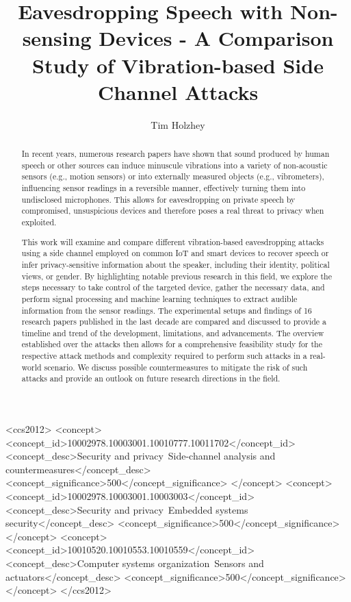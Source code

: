 \documentclass[sigconf, nonacm]{acmart}
\begin{document}
\title{Eavesdropping Speech with Non-sensing Devices - A Comparison Study of Vibration-based Side Channel Attacks}

\author{Tim Holzhey}

\begin{abstract}
  In recent years, numerous research papers have shown that sound produced by human speech or other sources can induce minuscule vibrations into a variety of non-acoustic sensors (e.g., motion sensors) or into externally measured objects (e.g., vibrometers), influencing sensor readings in a reversible manner, effectively turning them into undisclosed microphones.
  This allows for eavesdropping on private speech by compromised, unsuspicious devices and therefore poses a real threat to privacy when exploited.

  This work will examine and compare different vibration-based eavesdropping attacks using a side channel employed on common IoT and smart devices to recover speech or infer privacy-sensitive information about the speaker, including their identity, political views, or gender.
  By highlighting notable previous research in this field, we explore the steps necessary to take control of the targeted device, gather the necessary data, and perform signal processing and machine learning techniques to extract audible information from the sensor readings.
  The experimental setups and findings of 16 research papers published in the last decade are compared and discussed to provide a timeline and trend of the development, limitations, and advancements.
  The overview established over the attacks then allows for a comprehensive feasibility study for the respective attack methods and complexity required to perform such attacks in a real-world scenario.
  We discuss possible countermeasures to mitigate the risk of such attacks and provide an outlook on future research directions in the field.
\end{abstract}

\begin{CCSXML}
  <ccs2012>
  <concept>
  <concept_id>10002978.10003001.10010777.10011702</concept_id>
  <concept_desc>Security and privacy~Side-channel analysis and countermeasures</concept_desc>
  <concept_significance>500</concept_significance>
  </concept>
  <concept>
  <concept_id>10002978.10003001.10003003</concept_id>
  <concept_desc>Security and privacy~Embedded systems security</concept_desc>
  <concept_significance>500</concept_significance>
  </concept>
  <concept>
  <concept_id>10010520.10010553.10010559</concept_id>
  <concept_desc>Computer systems organization~Sensors and actuators</concept_desc>
  <concept_significance>500</concept_significance>
  </concept>
  </ccs2012>
\end{CCSXML}
\end{document}
